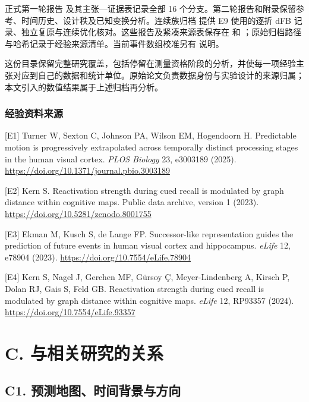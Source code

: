\documentclass[11pt,a4paper]{article}
\begin{document}
\endgroup

正式第一轮报告 
及其主张—证据表记录全部 16
个分支。第二轮报告和附录保留参考、时间历史、设计秩及已知变换分析。连续族归档
 提供 E9 使用的逐折 dFB
记录、独立复原与连续优化核对。这些报告及紧凑来源表保存在
 和
；原始归档路径与哈希记录于经验来源清单。当前事件数组校准另有
 说明。

这份目录保留完整研究覆盖，包括停留在测量资格阶段的分析，并使每一项经验主张对应到自己的数据和统计单位。原始论文负责数据身份与实验设计的来源归属；本文引入的数值结果属于上述归档再分析。

\subsubsection{经验资料来源}\label{ux7ecfux9a8cux8d44ux6599ux6765ux6e90}

{[}E1{]} Turner W, Sexton C, Johnson PA, Wilson EM, Hogendoorn H.
Predictable motion is progressively extrapolated across temporally
distinct processing stages in the human visual cortex. \emph{PLOS
Biology} 23, e3003189 (2025).
\url{https://doi.org/10.1371/journal.pbio.3003189}

{[}E2{]} Kern S. Reactivation strength during cued recall is modulated
by graph distance within cognitive maps. Public data archive, version 1
(2023). \url{https://doi.org/10.5281/zenodo.8001755}

{[}E3{]} Ekman M, Kusch S, de Lange FP. Successor-like representation
guides the prediction of future events in human visual cortex and
hippocampus. \emph{eLife} 12, e78904 (2023).
\url{https://doi.org/10.7554/eLife.78904}

{[}E4{]} Kern S, Nagel J, Gerchen MF, Gürsoy Ç, Meyer-Lindenberg A,
Kirsch P, Dolan RJ, Gais S, Feld GB. Reactivation strength during cued
recall is modulated by graph distance within cognitive maps.
\emph{eLife} 12, RP93357 (2024).
\url{https://doi.org/10.7554/eLife.93357}

\clearpage

\section{C.
与相关研究的关系}\label{c.-ux4e0eux76f8ux5173ux7814ux7a76ux7684ux5173ux7cfb}

\subsection{C1.
预测地图、时间背景与方向}\label{c1.-ux9884ux6d4bux5730ux56feux65f6ux95f4ux80ccux666fux4e0eux65b9ux5411}
\end{document}
